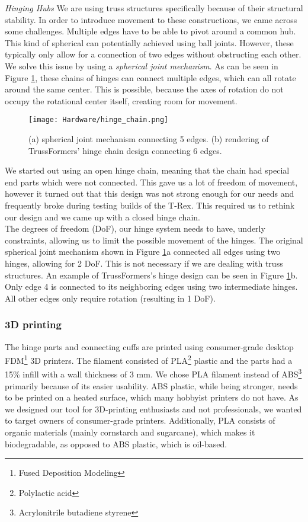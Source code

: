 \textit{Hinging Hubs}
We are using truss structures specifically because of their structural stability. In order to introduce movement to these constructions, we came across some challenges. Multiple edges have to be able to pivot around a common hub. This kind of spherical can potentially achieved using ball joints. However, these typically only allow for a connection of two edges without obstructing each other.\\
We solve this issue by using a \textit{spherical joint mechanism}. As can be seen in Figure \ref{fig:hinge_chain}, these chains of hinges can connect multiple edges, which can all rotate around the same center. This is possible, because the axes of rotation do not occupy the rotational center itself, creating room for movement.\\
\begin{figure}[h!]
    \texttt{[image: Hardware/hinge\_chain.png]}
    \centering
    \caption{(a) spherical joint mechanism connecting 5 edges. (b) rendering of TrussFormers' hinge chain design connecting 6 edges.}
    \label{fig:hinge_chain}
\end{figure}
We started out using an open hinge chain, meaning that the chain had special end parts which were not connected. This gave us a lot of freedom of movement, however it turned out that this design was not strong enough for our needs and frequently broke during testing builds of the T-Rex. This required us to rethink our design and we came up with a closed hinge chain.\\
The degrees of freedom (DoF), our hinge system needs to have, underly constraints, allowing us to limit the possible movement of the hinges. The original spherical joint mechanism shown in Figure \ref{fig:hinge_chain}a connected all edges using two hinges, allowing for 2 DoF. This is not necessary if we are dealing with truss structures. An example of TrussFormers's hinge design can be seen in Figure \ref{fig:hinge_chain}b. Only edge 4 is connected to its neighboring edges using two intermediate hinges. All other edges only require rotation (resulting in 1 DoF).

\subsubsection{3D printing}
The hinge parts and connecting cuffs are printed using consumer-grade desktop FDM\footnote{Fused Deposition Modeling} 3D printers. The filament consisted of PLA\footnote{Polylactic acid} plastic and the parts had a 15\% infill with a wall thickness of 3 mm. We chose PLA filament instead of ABS\footnote{Acrylonitrile butadiene styrene} primarily because of its easier usability. ABS plastic, while being stronger, needs to be printed on a heated surface, which many hobbyist printers do not have. As we designed our tool for 3D-printing enthusiasts and not professionals, we wanted to target owners of consumer-grade printers. Additionally, PLA consists of organic materials (mainly cornstarch and sugarcane), which makes it biodegradable, as opposed to ABS plastic, which is oil-based.

